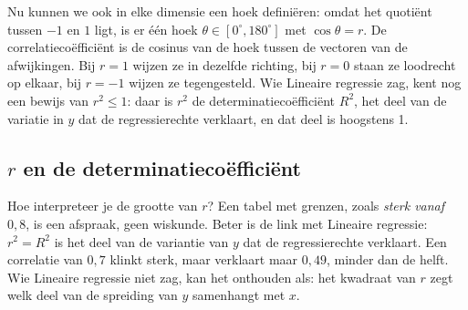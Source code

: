 Nu kunnen we ook in elke dimensie een hoek definiëren: omdat het quotiënt tussen $-1$ en $1$ ligt, is er één hoek $\theta \in [0^\circ, 180^\circ]$ met $\cos\theta = r$. De correlatiecoëfficiënt is de cosinus van de hoek tussen de vectoren van de afwijkingen. Bij $r = 1$ wijzen ze in dezelfde richting, bij $r = 0$ staan ze loodrecht op elkaar, bij $r = -1$ wijzen ze tegengesteld. Wie Lineaire regressie zag, kent nog een bewijs van $r^2 \leqslant 1$: daar is $r^2$ de determinatiecoëfficiënt $R^2$, het deel van de variatie in $y$ dat de regressierechte verklaart, en dat deel is hoogstens 1.


\begin{oefeningen}
\end{oefeningen}

\subsection{$r$ en de determinatiecoëfficiënt}

Hoe interpreteer je de grootte van $r$? Een tabel met grenzen, zoals \textit{sterk vanaf $0{,}8$}, is een afspraak, geen wiskunde. Beter is de link met Lineaire regressie: $r^2 = R^2$ is het deel van de variantie van $y$ dat de regressierechte verklaart. Een correlatie van $0{,}7$ klinkt sterk, maar verklaart maar $0{,}49$, minder dan de helft. Wie Lineaire regressie niet zag, kan het onthouden als: het kwadraat van $r$ zegt welk deel van de spreiding van $y$ samenhangt met $x$.

\begin{oefeningen}
\end{oefeningen}

